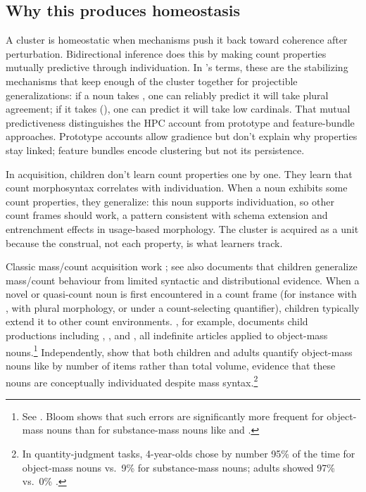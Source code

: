 \documentclass[12pt,a4paper]{article}
\begin{document}
\subsection{Why this produces homeostasis}\label{sec:homeostasis}

A cluster is homeostatic when mechanisms push it back toward coherence after perturbation. Bidirectional inference does this by making count properties mutually predictive through individuation. In \textcite{boyd1991}'s terms, these are the stabilizing mechanisms that keep enough of the cluster together for projectible generalizations: if a noun takes , one can reliably predict it will take plural agreement; if it takes (), one can predict it will take low cardinals. That mutual predictiveness distinguishes the HPC account from prototype and feature-bundle approaches. Prototype accounts allow gradience but don't explain why properties stay linked; feature bundles encode clustering but not its persistence.

In acquisition, children don't learn count properties one by one. They learn that count morphosyntax correlates with individuation. When a noun exhibits some count properties, they generalize: this noun supports individuation, so other count frames should work, a pattern consistent with schema extension and entrenchment effects in usage-based morphology. The cluster is acquired as a unit because the construal, not each property, is what learners track.

Classic mass/count acquisition work \citep{gordon1985,gordon1988,bloom1994a}; see also \textcite[\S5.3]{barner2005} documents that children generalize mass/count behaviour from limited syntactic and distributional evidence. When a novel or quasi-count noun is first encountered in a count frame (for instance with , with plural morphology, or under a count-selecting quantifier), children typically extend it to other count environments. \textcite{bloom1994a}, for example, documents child productions including , , and , all indefinite articles applied to object-mass nouns.\footnote{See \textcite[Table~3.2, pp.~59--60]{bloom1994a}. Bloom shows that such errors are significantly more frequent for object-mass nouns than for substance-mass nouns like  and .} Independently, \textcite{barner2005} show that both children and adults quantify object-mass nouns like  by number of items rather than total volume, evidence that these nouns are conceptually individuated despite mass syntax.\footnote{In quantity-judgment tasks, 4-year-olds chose by number 95\% of the time for object-mass nouns vs.\ 9\% for substance-mass nouns; adults showed 97\% vs.\ 0\% \citep[pp.~50--51]{barner2005}.}
\end{document}
